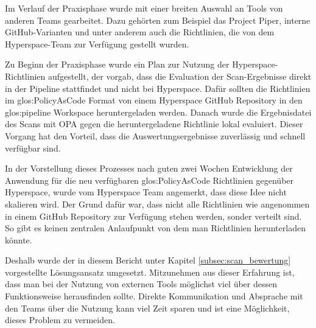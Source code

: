 \documentclass[../main.tex]{subfiles}
\begin{document}
Im Verlauf der Praxisphase wurde mit einer breiten Auswahl an Tools von anderen Teams gearbeitet.
Dazu gehörten zum Beispiel das Project Piper, interne GitHub-Varianten und unter anderem auch die Richtlinien, die von dem Hyperspace-Team zur Verfügung gestellt wurden.

Zu Beginn der Praxisphase wurde ein Plan zur Nutzung der Hyperspace-Richtlinien aufgestellt, der vorgab, dass die Evaluation der Scan-Ergebnisse direkt in der Pipeline stattfindet und nicht bei Hyperspace.
Dafür sollten die Richtlinien im \gls{glos:PolicyAsCode} Format von einem Hyperspace GitHub Repository in den \gls{glos:pipeline} Workspace heruntergeladen werden.
Danach wurde die Ergebnisdatei des Scans mit \gls{OPA} gegen die heruntergeladene Richtlinie lokal evaluiert.
Dieser Vorgang hat den Vorteil, dass die Auswertungsergebnisse zuverlässig und schnell verfügbar sind.

In der Vorstellung dieses Prozesses nach guten zwei Wochen Entwicklung der Anwendung für die neu verfügbaren \gls{glos:PolicyAsCode} Richtlinien gegenüber Hyperspace, wurde vom Hyperspace Team angemerkt, dass diese Idee nicht skalieren wird.
Der Grund dafür war, dass nicht alle Richtlinien wie angenommen in einem GitHub Repository zur Verfügung stehen werden, sonder verteilt sind.
So gibt es keinen zentralen Anlaufpunkt von dem man Richtlinien herunterladen könnte.

Deshalb wurde der in diesem Bericht unter Kapitel \ref{subsec:scan_bewertung} vorgestellte Lösungsansatz umgesetzt.
Mitzunehmen aus dieser Erfahrung ist, dass man bei der Nutzung von externen Tools möglichst viel über dessen Funktionsweise herausfinden sollte.
Direkte Kommunikation und Absprache mit den Teams über die Nutzung kann viel Zeit sparen und ist eine Möglichkeit, dieses Problem zu vermeiden.
\end{document}
